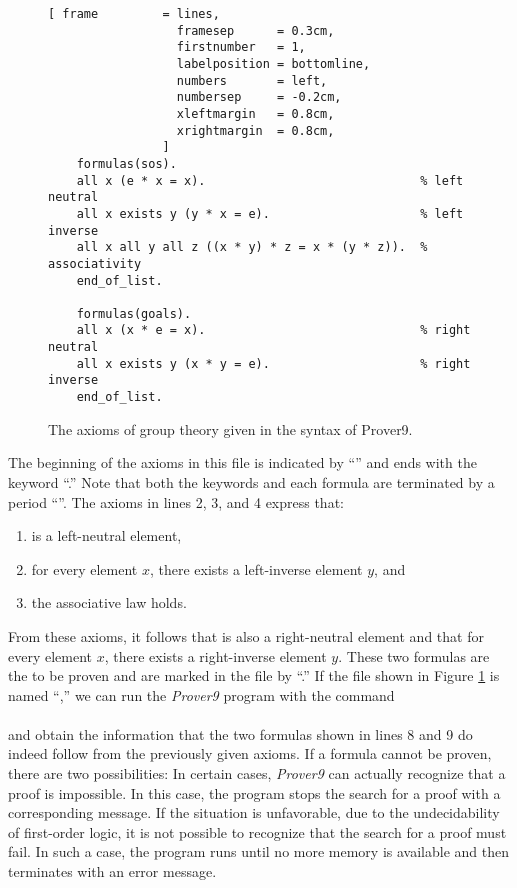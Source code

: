 \begin{figure}[!ht]
\centering
\begin{Verbatim}[ frame         = lines, 
                  framesep      = 0.3cm, 
                  firstnumber   = 1,
                  labelposition = bottomline,
                  numbers       = left,
                  numbersep     = -0.2cm,
                  xleftmargin   = 0.8cm,
                  xrightmargin  = 0.8cm,
                ]
    formulas(sos).
    all x (e * x = x).                              % left neutral 
    all x exists y (y * x = e).                     % left inverse
    all x all y all z ((x * y) * z = x * (y * z)).  % associativity
    end_of_list.
    
    formulas(goals).
    all x (x * e = x).                              % right neutral 
    all x exists y (x * y = e).                     % right inverse
    end_of_list.
\end{Verbatim}
\vspace*{-0.3cm}
\caption{The axioms of group theory given in the syntax of Prover9.}
\label{fig:group2.in}
\end{figure}


The beginning of the axioms in this file is indicated by ``'' and ends with the keyword
``.'' Note that both the keywords and each formula are terminated by a period ``''.
The axioms in lines 2, 3, and 4 express that: 
\begin{enumerate}
\item {} is a left-neutral element,
\item for every element $x$, there exists a left-inverse element $y$, and
\item the associative law holds.
\end{enumerate}
From these axioms, it follows that  is also a right-neutral element and that for every element $x$,
there exists a right-inverse element $y$. These two formulas are the  to be proven and are marked
in the file by ``.'' 
If the file shown in Figure \ref{fig:group2.in} is named ``,'' we can run the \textsl{Prover9}
program with the command 
\\[0.2cm]
\hspace*{1.3cm}
\\[0.2cm]
and obtain the information that the two formulas shown in lines 8 and 9 do indeed follow from the previously
given axioms. If a formula cannot be proven, there are two possibilities: In certain cases, \textsl{Prover9}
can actually recognize that a proof is impossible. In this case, the program stops the search for a proof with
a corresponding message. If the situation is unfavorable, due to the undecidability of first-order logic, it is
not possible to recognize that the search for a proof must fail. In such a case, the program runs until no more
memory is available and then terminates with an error message. 



